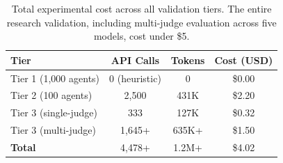 \documentclass{article}
\begin{document}
\begin{table}[h]
\centering
\small
\begin{tabular}{@{}lccc@{}}
\toprule
\textbf{Tier} & \textbf{API Calls} & \textbf{Tokens} & \textbf{Cost (USD)} \\
\midrule
Tier 1 (1,000 agents) & 0 (heuristic) & 0 & \$0.00 \\
Tier 2 (100 agents)   & 2,500 & 431K & \$2.20 \\
Tier 3 (single-judge)  & 333 & 127K & \$0.32 \\
Tier 3 (multi-judge)   & 1,645+ & 635K+ & \$1.50 \\
\midrule
\textbf{Total}        & 4,478+ & 1.2M+ & \$4.02 \\
\bottomrule
\end{tabular}
\caption{Total experimental cost across all validation tiers. The entire research validation, including multi-judge evaluation across five models, cost under \$5.}
\label{tab:costs}
\end{table}
\end{document}
